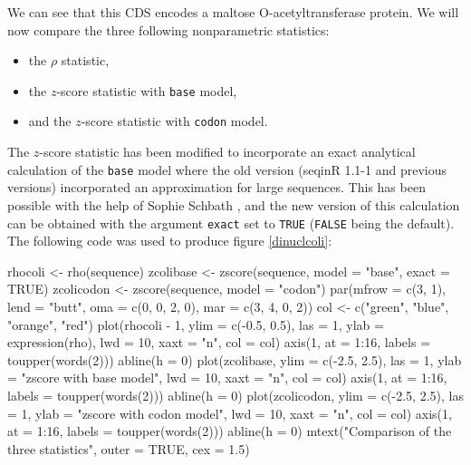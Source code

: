 \documentclass{article}
\begin{document}
We can see
that this CDS encodes a maltose O-acetyltransferase protein. 
We will now compare the three
following nonparametric statistics:

\begin{itemize}
\item the $\rho$ statistic,
\item the $z$-score statistic with \texttt{base} model,
\item and the $z$-score statistic with \texttt{codon} model.
\end{itemize}

The $z$-score statistic has been modified to incorporate an exact
analytical calculation of the \texttt{base} model where the old 
version (seqinR 1.1-1 and previous versions) incorporated an
approximation for large sequences. This has been possible with the
help of Sophie Schbath \cite{Schbath-thesis}, and the new version of
this calculation can be obtained with the argument \texttt{exact} 
set to \texttt{TRUE} (\texttt{FALSE} being the default). The following
code was used to produce figure \ref{dinuclcoli}:

\begin{Schunk}
\begin{Sinput}
 rhocoli <- rho(sequence)
 zcolibase <- zscore(sequence, model = "base", exact = TRUE)
 zcolicodon <- zscore(sequence, model = "codon")
 par(mfrow = c(3, 1), lend = "butt", oma = c(0, 0, 2, 0), mar = c(3, 
     4, 0, 2))
 col <- c("green", "blue", "orange", "red")
 plot(rhocoli - 1, ylim = c(-0.5, 0.5), las = 1, ylab = expression(rho), 
     lwd = 10, xaxt = "n", col = col)
 axis(1, at = 1:16, labels = toupper(words(2)))
 abline(h = 0)
 plot(zcolibase, ylim = c(-2.5, 2.5), las = 1, ylab = "zscore with base model", 
     lwd = 10, xaxt = "n", col = col)
 axis(1, at = 1:16, labels = toupper(words(2)))
 abline(h = 0)
 plot(zcolicodon, ylim = c(-2.5, 2.5), las = 1, ylab = "zscore with codon model", 
     lwd = 10, xaxt = "n", col = col)
 axis(1, at = 1:16, labels = toupper(words(2)))
 abline(h = 0)
 mtext("Comparison of the three statistics", outer = TRUE, 
     cex = 1.5)
\end{Sinput}
\end{Schunk}

\begin{figure}
\centering{}
\end{figure}
\end{document}
